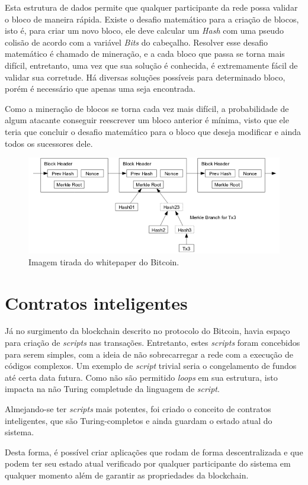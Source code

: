\documentclass{ufsctex/ufsctex}
\begin{document}
Esta estrutura de dados permite que qualquer participante da rede possa validar o
bloco de maneira rápida. Existe o desafio matemático para a criação de blocos, isto é,
para criar um novo bloco, ele deve calcular um \textit{Hash} com uma pseudo colisão de acordo
com a variável \textit{Bits} do cabeçalho. Resolver esse desafio matemático é chamado
de mineração, e a cada bloco que passa se torna mais difícil, entretanto, uma vez
que sua solução é conhecida, é extremamente fácil de validar sua corretude. Há diversas
soluções possíveis para determinado bloco, porém é necessário que apenas uma seja
encontrada.\cite{Antonopoulos}

Como a mineração de blocos se torna cada vez mais difícil, a probabilidade de algum
atacante conseguir reescrever um bloco anterior é mínima, visto que ele teria que concluir
o desafio matemático para o bloco que deseja modificar e ainda todos os sucessores dele.

\begin{figure}[h]
	\centering
	\includegraphics[scale=0.4]{blockchain}
	\caption{Imagem tirada do whitepaper do Bitcoin.}
	\label{fig:blockchain}
\end{figure}

\section{Contratos inteligentes}

Já no surgimento da blockchain descrito no protocolo do Bitcoin, havia espaço para 
criação de \textit{scripts} nas transações. Entretanto, estes \textit{scripts} foram concebidos
para serem simples, com a ideia de não sobrecarregar a rede com a execução de códigos
complexos. Um exemplo de \textit{script} trivial seria o congelamento de fundos até
certa data futura. Como não são  permitido \textit{loops} em sua estrutura, isto impacta
na não Turing completude da linguagem de \textit{script}.\cite{nakamoto2012bitcoin}

Almejando-se ter \textit{scripts} mais potentes, foi criado o conceito de contratos
inteligentes, que são Turing-completos e ainda guardam o estado atual do sistema.
\cite{ethereum}

Desta forma, é possível criar aplicações que rodam de forma descentralizada e que podem
ter seu estado atual verificado por qualquer participante do sistema em qualquer
momento além de garantir as propriedades da blockchain.



\end{document}
